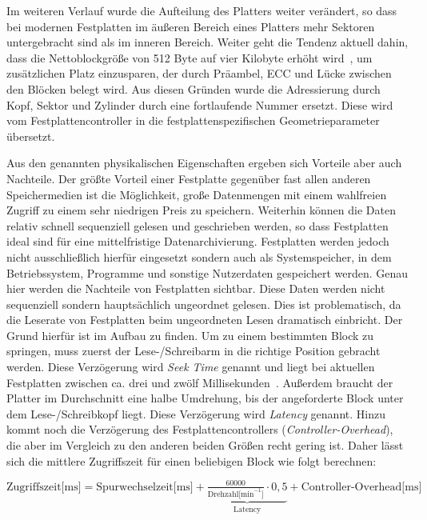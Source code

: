 Im weiteren Verlauf wurde die Aufteilung des Platters weiter verändert, so dass bei modernen Festplatten im äußeren Bereich eines Platters mehr Sektoren
untergebracht sind als im inneren Bereich. Weiter geht die Tendenz aktuell dahin, dass die Nettoblockgröße von 512 Byte auf vier Kilobyte erhöht 
wird~\cite[vgl.][]{wdc}, um zusätzlichen Platz einzusparen, der durch Präambel, \ac{ECC} und Lücke zwischen den Blöcken belegt wird. Aus diesen Gründen wurde die
Adressierung durch Kopf, Sektor und Zylinder durch eine fortlaufende Nummer ersetzt. Diese wird vom Festplattencontroller in die festplattenspezifischen
Geometrieparameter übersetzt.

Aus den genannten physikalischen Eigenschaften ergeben sich Vorteile aber auch Nachteile. Der größte Vorteil einer Festplatte gegenüber fast allen anderen
Speichermedien ist die Möglichkeit, große Datenmengen mit einem wahlfreien Zugriff zu einem sehr niedrigen Preis zu speichern. Weiterhin können die Daten relativ
schnell sequenziell gelesen und geschrieben werden, so dass Festplatten ideal sind für eine mittelfristige Datenarchivierung. Festplatten werden jedoch nicht
ausschließlich hierfür eingesetzt sondern auch als Systemspeicher, in dem Betriebssystem, Programme und sonstige Nutzerdaten gespeichert werden. Genau hier
werden die Nachteile von Festplatten sichtbar. Diese Daten werden nicht sequenziell sondern hauptsächlich ungeordnet gelesen. Dies ist problematisch, da die
Leserate von Festplatten beim ungeordneten Lesen dramatisch einbricht. Der Grund hierfür ist im Aufbau zu finden. Um zu einem bestimmten Block zu springen, muss
zuerst der Lese-/Schreibarm in die richtige Position gebracht werden. Diese Verzögerung wird \textit{Seek Time} genannt und liegt bei aktuellen Festplatten
zwischen ca. drei und zwölf Millisekunden~\cite{seagate1,samsung1}. Außerdem braucht der Platter im Durchschnitt eine halbe Umdrehung, bis der
angeforderte Block unter dem Lese-/Schreibkopf liegt. Diese Verzögerung wird \textit{Latency} genannt. Hinzu kommt noch die Verzögerung des
Festplattencontrollers (\textit{Controller-Overhead}), die aber im Vergleich zu den anderen beiden Größen recht gering ist. Daher lässt sich die mittlere
Zugriffszeit für einen beliebigen Block wie folgt berechnen:

\begin{center}
$\text{Zugriffszeit[ms]} = \text{Spurwechselzeit[ms]} + \underbrace{\frac{60000}{\text{Drehzahl[min}^{-1}\text{]}} \cdot 0,5}_{\text{Latency}} +
\text{Controller-Overhead[ms]}$
\end{center}

